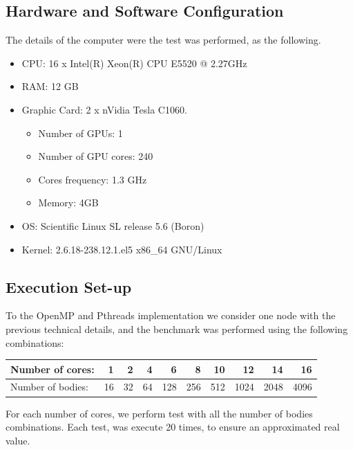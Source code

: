 \subsection{Hardware and Software Configuration}

The details of the computer were the test was performed,
as the following.

\begin{footnotesize}
\begin{itemize}
	\item CPU: 16 x Intel(R) Xeon(R) CPU E5520  @ 2.27GHz
	\item RAM: 12 GB
	\item Graphic Card: 2 x nVidia Tesla C1060.
	\begin{itemize}
		\item Number of GPUs: 1
		\item Number of GPU cores: 240
		\item Cores frequency: 1.3 GHz
		\item Memory: 4GB
	\end{itemize}
	\item OS: Scientific Linux SL release 5.6 (Boron)
	\item Kernel: 2.6.18-238.12.1.el5 x86\_64 GNU/Linux
\end{itemize}
\end{footnotesize}

\subsection{Execution Set-up}

To the OpenMP and Pthreads implementation
we consider one node with the previous technical details,
and the benchmark was performed using the following combinations:

\begin{center}
\begin{tiny}
\begin{tabular}{|l|r|r|r|r|r|r|r|r|r|}
	\hline
	Number of cores: & 1 & 2 & 4 & 6 & 8 & 10 & 12 & 14 & 16 \\
	\hline
	Number of bodies: & 16 & 32 & 64 & 128 & 256 & 512 & 1024 & 2048 & 4096 \\
	\hline
\end{tabular}
\end{tiny}
\end{center}

For each number of cores, we perform test with all the number of bodies combinations.
Each test, was execute 20 times, to ensure an approximated real value.

